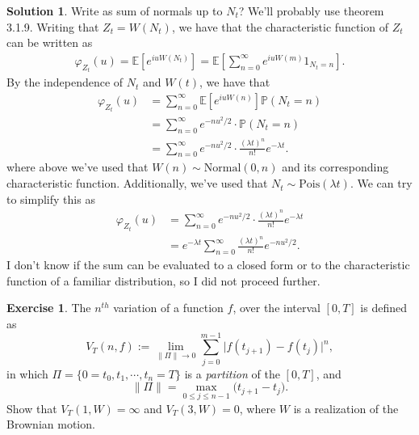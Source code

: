 \documentclass[12pt]{article}
\newcommand{\Prob}{\mathbb{P}}
\newcommand{\Expect}{\mathbb{E}}
\renewcommand{\phi}{\varphi}
\theoremstyle{definition}
\newtheorem{exer}{Exercise}
\newtheorem{sol}{Solution}
\theoremstyle{remark}
\begin{document}
\begin{sol}
    Write as sum of normals up to $N_{t}$? We'll probably use theorem 3.1.9.
    Writing that $Z_{t} = W(N_{t})$, we have that the characteristic function of $Z_{t}$ can be written as
    \begin{align*}
        \phi_{Z_{t}}(u) = \Expect[ e^{iu W(N_{t})}] = \Expect\left[ \sum_{n=0}^{\infty} e^{iu W(m)} 1_{N_{t} = n} \right].
    \end{align*}
    By the independence of $N_{t}$ and $W(t)$, we have that
    \begin{align*}
        \phi_{Z_{t}}(u) &= \sum_{n=0}^{\infty} \Expect\left[e^{iu W(n)}\right] \Prob(N_{t} = n)\\
                        &= \sum_{n=0}^{\infty} e^{-n u^{2} / 2} \cdot \Prob(N_{t} = n)\\
                        &=\sum_{n=0}^{\infty} e^{-n u^{2} / 2} \cdot \frac{(\lambda t)^{n}}{n!} e^{-\lambda t}.
    \end{align*}
    where above we've used that $W(n) \sim \text{Normal}(0, n)$ and its corresponding characteristic function. Additionally, we've used that $N_{t} \sim \text{Pois}(\lambda t)$. We can try to simplify this as
    \begin{align*}
        \phi_{Z_{t}}(u) &= \sum_{n=0}^{\infty} e^{-n u^{2} / 2} \cdot \frac{(\lambda t)^{n}}{n!} e^{-\lambda t}\\
                        &= e^{-\lambda t} \sum_{n=0}^{\infty} \frac{(\lambda t)^{n}}{n!} e^{-n u^{2} / 2}.
    \end{align*}
    I don't know if the sum can be evaluated to a closed form or to the characteristic function of a familiar distribution, so I did not proceed further.
\end{sol}

\newpage

\begin{exer}
 The $n^{th}$ variation of a function $f$, over the 
interval $[0,T]$ is defined as 
\[
   V_T(n,f) := \lim_{\|\Pi\|\to 0} \sum_{j=0}^{m-1} 
      \Big| f(t_{j+1})-f(t_j) \Big|^n, 
\]
in which $\Pi=\{0=t_0, t_1,\cdots, t_n=T\}$ is a {\em partition} of the $[0,T]$, and 
\[
         \|\Pi\| = \max_{0\le j\le n-1}\big( t_{j+1}-t_j\big).
\]
Show that $V_T(1,W)=\infty$ and $V_T(3,W)=0$, where $W$ is a realization
of the Brownian motion.
\end{exer}
\end{document}
